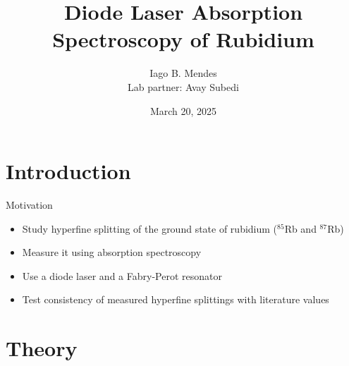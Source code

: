 \documentclass{../talk}
\title{Diode Laser Absorption Spectroscopy of Rubidium}
\author[Iago B. Mendes]{Iago B. Mendes \\ Lab partner: Avay Subedi}
\date{March 20, 2025}
\begin{document}
\maketitle

\section{Introduction}

\begin{frame}{Motivation}
  \begin{itemize}
    \item Study hyperfine splitting of the ground state of rubidium ($^{85}$Rb and $^{87}$Rb)
    \item<2-> Measure it using absorption spectroscopy
    \item<3-> Use a diode laser and a Fabry-Perot resonator
    \item<4-> Test consistency of measured hyperfine splittings with literature values
\end{itemize}

\end{frame}

\section{Theory}
\end{document}

